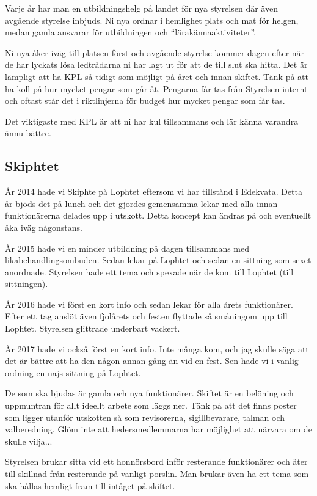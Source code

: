 \documentclass[10pt]{article}
\begin{document}
Varje år har man en utbildningshelg på landet för nya styrelsen där även avgående styrelse inbjuds. Ni nya ordnar i hemlighet plats och mat för helgen, medan gamla ansvarar för utbildningen och ``lärakännaaktiviteter''.

Ni nya åker iväg till platsen först och avgående styrelse kommer dagen efter när de har lyckats lösa ledtrådarna ni har lagt ut för att de till slut ska hitta. Det är lämpligt att ha KPL så tidigt som möjligt på året och innan skiftet. Tänk på att ha koll på hur mycket pengar som går åt. Pengarna får tas från Styrelsen internt och oftast står det i riktlinjerna för budget hur mycket pengar som får tas.

Det viktigaste med KPL är att ni har kul tillsammans och lär känna varandra ännu bättre.

\subsection{Skiphtet}

År 2014 hade vi Skiphte på Lophtet eftersom vi har tillstånd i Edekvata. Detta år bjöds det på lunch och det gjordes gemensamma lekar med alla innan funktionärerna delades upp i utskott. Detta koncept kan ändras på och eventuellt åka iväg någonstans.

År 2015 hade vi en minder utbildning på dagen tillsammans med likabehandlingsombuden. Sedan lekar på Lophtet och sedan en sittning som sexet anordnade. Styrelsen hade ett tema och spexade när de kom till Lophtet (till sittningen).

År 2016 hade vi först en kort info och sedan lekar för alla årets funktionärer. Efter ett tag anslöt även fjolårets och festen flyttade så småningom upp till Lophtet. Styrelsen glittrade underbart vackert.

År 2017 hade vi också först en kort info. Inte många kom, och jag skulle säga att det är bättre att ha den någon annan gång än vid en fest. Sen hade vi i vanlig ordning en najs sittning på Lophtet.

De som ska bjudas är gamla och nya funktionärer. Skiftet är en belöning och uppmuntran för allt ideellt arbete som läggs ner. Tänk på att det finns poster som ligger utanför utskotten så som revisorerna, sigillbevarare, talman och valberedning. Glöm inte att hedersmedlemmarna har möjlighet att närvara om de skulle vilja...

Styrelsen brukar sitta vid ett honnörsbord inför resterande funktionärer och äter till skillnad från resterande på vanligt porslin. Man brukar även ha ett tema som ska hållas hemligt fram till intåget på skiftet.
\end{document}
